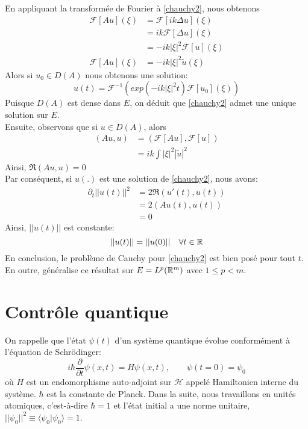 En appliquant la transformée de Fourier à \eqref{chauchy2}, nous obtenons
\begin{align*} 
\mathcal{F}[Au](\xi) &= \mathcal{F}[ik\Delta u](\xi) \\ 
&= ik\mathcal{F}[\Delta u](\xi) \\
&= -ik|\xi|^2 \mathcal{F}[u](\xi) \\
\mathcal{F}[Au](\xi) &= -ik|\xi|^2 \tilde{u}(\xi)
\end{align*}
Alors si $u_0 \in D(A)$ nous obtenons une solution:
\begin{equation}
u(t)=\mathcal{F}^{-1}(exp(-ik|\xi|^2 t)\mathcal{F}[u_0](\xi))
\end{equation}
Puisque $D(A)$ est dense dans $E$, on déduit que \eqref{chauchy2} admet une unique solution sur $E$.\\
Ensuite, observons que si $u \in D(A)$, alors
\begin{align*}
(Au,u) &= (\mathcal{F}[Au],\mathcal{F}[u])\\
&= ik\int|\xi|^2 |\tilde{u}|^2
\end{align*}
Ainsi, $\Re (Au,u)=0$\\
Par conséquent, si $u(.)$ est une solution de \eqref{chauchy2}, nous avons:
\begin{align*}
\partial_{t}||u(t)||^2 &= 2 \Re (u'(t),u(t))\\
&= 2 (Au(t),u(t))\\
&=0
\end{align*}
Ainsi, $||u(t)||$ est constante:
\begin{equation} \label{normecons}
||u(t)||=||u(0)|| \quad \forall t \in \mathbb R
\end{equation}
En conclusion, le problème de Cauchy pour \eqref{chauchy2} est bien posé pour tout $t$.\\
En outre, \cite{Fattorini} généralise ce résultat sur $E=L^p (\mathbb R^m)$ avec $1 \leq p < m$.

\section{Contrôle quantique}
On rappelle que l'état $\psi(t)$ d'un système quantique évolue conformément à l'équation de Schrödinger:
\begin{equation}
i \hbar \dfrac{\partial }{\partial t} \psi (x,t) = H\psi (x,t),\quad \quad \psi(t=0)=\psi_0
\end{equation}
où $H$ est un endomorphisme auto-adjoint sur $\mathcal{H}$ appelé Hamiltonien interne du système. $\hbar$ est la constante de Planck. Dans la suite, nous travaillons en unités atomiques, c'est-à-dire $\hbar=1$ et l'état initial a une norme unitaire, $||\psi_0||^2 \equiv \langle \psi_0|\psi_0 \rangle =1$.
